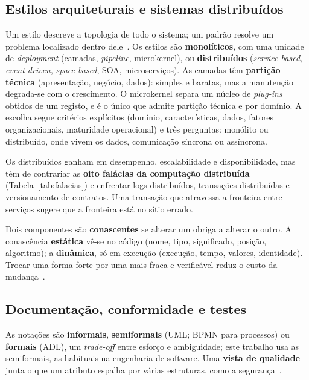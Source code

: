 \subsection{Estilos arquiteturais e sistemas distribuídos}
\label{sec:estilos}

Um estilo descreve a topologia de todo o sistema; um padrão resolve um problema localizado dentro
dele~\cite{bastofernandes2026}. Os estilos são \textbf{monolíticos}, com uma unidade de \emph{deployment} (camadas,
\emph{pipeline}, microkernel), ou \textbf{distribuídos} (\emph{service-based}, \emph{event-driven},
\emph{space-based}, SOA, microserviços). As camadas têm \textbf{partição técnica} (apresentação, negócio, dados):
simples e baratas, mas a manutenção degrada-se com o crescimento. O microkernel separa um núcleo de \emph{plug-ins}
obtidos de um registo, e é o único que admite partição técnica e por domínio. A escolha segue critérios explícitos
(domínio, características, dados, fatores organizacionais, maturidade operacional) e três perguntas: monólito ou
distribuído, onde vivem os dados, comunicação síncrona ou assíncrona.

Os distribuídos ganham em desempenho, escalabilidade e disponibilidade, mas têm de contrariar as \textbf{oito
falácias da computação distribuída} (Tabela~\ref{tab:falacias}) e enfrentar logs distribuídos, transações
distribuídas e versionamento de contratos. Uma transação que atravessa a fronteira entre serviços sugere que a
fronteira está no sítio errado.

Dois componentes são \textbf{conascentes} se alterar um obriga a alterar o outro. A conascência \textbf{estática}
vê-se no código (nome, tipo, significado, posição, algoritmo); a \textbf{dinâmica}, só em execução (execução, tempo,
valores, identidade). Trocar uma forma forte por uma mais fraca e verificável reduz o custo da
mudança~\cite{bastofernandes2026}.

\subsection{Documentação, conformidade e testes}
\label{sec:documentacao}

As notações são \textbf{informais}, \textbf{semiformais} (UML; BPMN para processos) ou \textbf{formais} (ADL), um
\emph{trade-off} entre esforço e ambiguidade; este trabalho usa as semiformais, as habituais na engenharia de
software. Uma \textbf{vista de qualidade} junta o que um atributo espalha por várias estruturas, como a
segurança~\cite{bastofernandes2026}.

